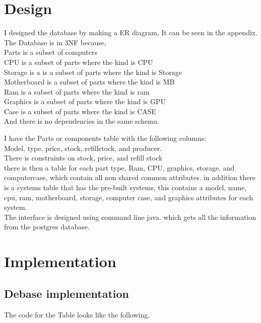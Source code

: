\documentclass[a4paper,10pt,titlepage]{report}
\begin{document}
\section{Design}
I designed the database by making a ER diagram, It can be seen in the appendix.\\
The Database is in 3NF because,\\
Parts is a subset of computers \\
CPU is a subset of parts where the kind is CPU\\
Storage is a is a subset of parts where the kind is Storage \\
Motherboard is a subset of parts where the kind is MB \\
Ram is a subset of parts where the kind is ram \\
Graphics is a subset of parts where the kind is GPU \\
Case is a subset of parts where the kind is CASE \\
And there is no dependencies in the same schema. 

\vspace{5 mm}
I have the Parts or components table with the following columns:
\\ \vspace{2 mm}
Model, type, price, stock, refillstock, and producer. 
\\ \vspace{2 mm}
There is constraints on stock, price, and refill stock
\\
there is then a table for each part type, Ram, CPU, graphics, storage, and computercase, which contain all non shared common attributes.
in addition there is a systems table that has the pre-built systems, this contains a model, name, cpu, ram, motherboard, storage, computer case, and graphics attributes for each system.
\\
The interface is designed using command line java. which gets all the information from the postgres database.




\newpage
\section{Implementation}
\subsection{Debase implementation}

The code for the Table looks like the following.

\end{document}
